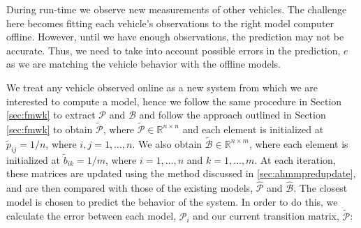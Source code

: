 \documentclass[letterpaper, 10 pt, conference]{ieeeconf}  %
\newcommand\NB[1]{$\spadesuit$\footnote{NB: #1}}
\begin{document}

During run-time we observe new measurements of other vehicles. The challenge here becomes fitting each vehicle's observations to the right model computer offline. However, until we have enough observations, the prediction may not be accurate. Thus, we need to take into account possible errors in the prediction, $e$ as we are matching the vehicle behavior with the offline models. 



We treat any vehicle observed online as a new system from which we are interested to compute a model, hence we follow the same procedure in Section \ref{sec:fmwk} to extract $\mathcal{P}$ and $\mathcal{B}$ and follow the approach outlined in Section \ref{sec:fmwk} to obtain $\tilde{\mathcal{P}}$, where $\tilde{\mathcal{P}}\in\mathbb{R}^{n\times n}$ and each element is initialized at $\tilde{p}_{ij} = 1/n$, where $i,j = 1,\ldots,n$. We also obtain $\tilde{\mathcal{B}}\in\mathbb{R}^{n\times m}$, where each element is initialized at $\tilde{b}_{ik}= 1/m$, where $i = 1,\ldots,n$ and $k=1,\ldots,m$. At each iteration, these matrices are updated using the method discussed in \ref{sec:ahmmpredupdate}, and are then compared with those of the existing models, $\hat{\mathcal{P}}$ and $\hat{\mathcal{B}}$. The closest model is chosen to predict the behavior of the system. In order to do this, we calculate the error between each model, $\mathcal{P}_i$ and our current transition matrix, $\tilde{\mathcal{P}}$:
\end{document}

